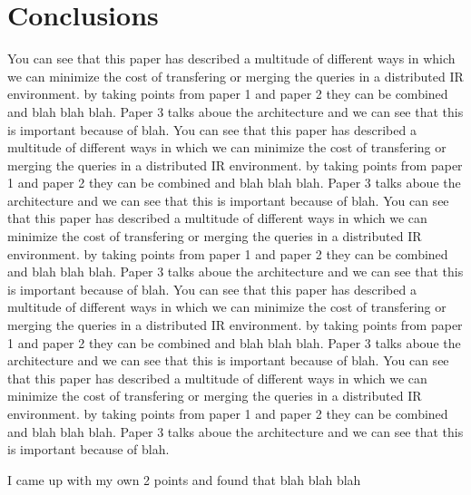 \documentclass{acm_proc_article-sp}
\begin{document}
\section{Conclusions}
You can see that this paper has described a multitude of different ways in which we can minimize the cost of transfering or merging the queries in a distributed IR environment. by taking points from paper 1 and paper 2 they can be combined and blah blah blah. Paper 3 talks aboue the architecture and we can see that this is important because of blah.
You can see that this paper has described a multitude of different ways in which we can minimize the cost of transfering or merging the queries in a distributed IR environment. by taking points from paper 1 and paper 2 they can be combined and blah blah blah. Paper 3 talks aboue the architecture and we can see that this is important because of blah.
You can see that this paper has described a multitude of different ways in which we can minimize the cost of transfering or merging the queries in a distributed IR environment. by taking points from paper 1 and paper 2 they can be combined and blah blah blah. Paper 3 talks aboue the architecture and we can see that this is important because of blah.
You can see that this paper has described a multitude of different ways in which we can minimize the cost of transfering or merging the queries in a distributed IR environment. by taking points from paper 1 and paper 2 they can be combined and blah blah blah. Paper 3 talks aboue the architecture and we can see that this is important because of blah.
You can see that this paper has described a multitude of different ways in which we can minimize the cost of transfering or merging the queries in a distributed IR environment. by taking points from paper 1 and paper 2 they can be combined and blah blah blah. Paper 3 talks aboue the architecture and we can see that this is important because of blah.

I came up with my own 2 points and found that blah blah blah


 

\balancecolumns
\end{document}
